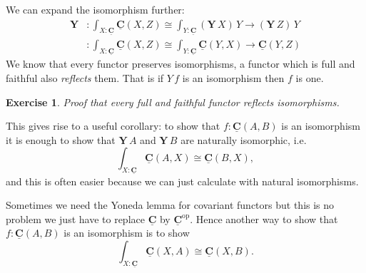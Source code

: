 \documentclass{article}
\newcommand{\Set}{\mathbf{Set}}
\newcommand{\cat}[1]{\underline{\mathbf{#1}}}
\newcommand{\homC}[3]{\cat{#1}(#2,#3)}
\newcommand{\op}{\mathrm{op}}
\newcommand{\Y}{\mathbf{Y}}
\newcommand{\PSh}{\mathbf{PSh}}
\newtheorem{exercise}{Exercise}
\begin{document}
We can expand the isomorphism further:
\begin{align*}
\Y      & : \int_{X:\cat{C}} \homC{C}{X}{Z} \cong \int_{Y : \cat{C}} (\Y\,X)\,Y \to (\Y\,Z)\,Y \\
         & : \int_{X:\cat{C}} \homC{C}{X}{Z} \cong \int_{Y : \cat{C}} \homC{C}{Y}{X}\to \homC{C}{Y}{Z}
\end{align*}
We know that every functor preserves isomorphisms, a functor which is full and faithful also \emph{reflects} them. That is if $Y\,f$ is an isomorphism then $f$ is one. 
\begin{exercise}
  Proof that every full and faithful functor reflects isomorphisms. 
\end{exercise}
This gives rise to a useful corollary: to show that $f : \homC{C}{A}{B}$ is an isomorphism it is enough to show that $\Y\,A$ and $\Y\,B$ are naturally isomorphic, i.e.
\[ \int_{X:\cat{C}} \homC{C}{A}{X} \cong \homC{C}{B}{X} ,\]
and this is often easier because we can just calculate with natural isomorphisms.

Sometimes we need the Yoneda lemma for covariant functors but this is no problem we just have to replace $\cat{C}$ by $\cat{C}^\op$. Hence another way to show that $f:\homC{C}{A}{B}$ is an isomorphism is to show
\[ \int_{X:\cat{C}} \homC{C}{X}{A} \cong \homC{C}{X}{B}. \]

\end{document}
